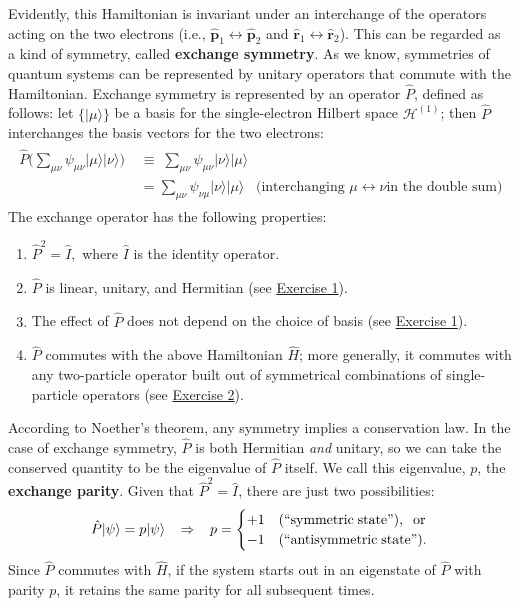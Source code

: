 \documentclass[pra,12pt]{revtex4-2}
\begin{document}
Evidently, this Hamiltonian is invariant under an interchange of the
operators acting on the two electrons (i.e., $\hat{\mathbf{p}}_1
\leftrightarrow \hat{\mathbf{p}}_2$ and $\hat{\mathbf{r}}_1
\leftrightarrow \hat{\mathbf{r}}_2$).  This can be regarded as a kind
of symmetry, called \textbf{exchange symmetry}.  As we know,
symmetries of quantum systems can be represented by unitary operators
that commute with the Hamiltonian.  Exchange symmetry is represented
by an operator $\hat{P}$, defined as follows: let $\{|\mu\rangle\}$
be a basis for the single-electron Hilbert space $\mathscr{H}^{(1)}$;
then $\hat{P}$ interchanges the basis vectors for the two electrons:
\begin{align}
  \begin{aligned}\hat{P} \Big (\sum_{\mu\nu}
    \psi_{\mu\nu} |\mu\rangle|\nu\rangle \Big)
    \;&\equiv\;  \sum_{\mu\nu} \psi_{\mu\nu} |\nu\rangle|\mu\rangle \\
    &= \sum_{\mu\nu} \psi_{\nu\mu} |\nu\rangle|\mu\rangle
    \;\;\;\textrm{(interchanging $\mu\leftrightarrow \nu$
      in the double sum)}\end{aligned}
\end{align}
The exchange operator has the following properties:
\begin{enumerate}
\item $\hat{P}^2 = \hat{I},$ where $\hat{I}$ is the identity operator.

\item $\hat{P}$ is linear, unitary, and Hermitian (see
  \hyperref[ex:1]{Exercise 1}).
  
\item The effect of $\hat{P}$ does not depend on the choice
  of basis (see \hyperref[ex:1]{Exercise 1}).

\item $\hat{P}$ commutes with the above Hamiltonian $\hat{H}$; more
  generally, it commutes with any two-particle operator built out of
  symmetrical combinations of single-particle operators (see
  \hyperref[ex:2]{Exercise 2}).
\end{enumerate}

According to Noether's theorem, any symmetry implies a conservation
law.  In the case of exchange symmetry, $\hat{P}$ is both Hermitian
\textit{and} unitary, so we can take the conserved quantity to be the
eigenvalue of $\hat{P}$ itself.  We call this eigenvalue, $p$, the
\textbf{exchange parity}.  Given that $\hat{P}^2 = \hat{I}$, there are
just two possibilities:
\begin{equation}
  \hat{P} |\psi\rangle = p|\psi\rangle \;\;\;\Rightarrow\;\;\; p = \begin{cases}+1 & \textrm{(``symmetric\;state'')}, \;\;\textrm{or} \\ -1 & \textrm{(``antisymmetric\;state'').}\end{cases}
\end{equation}
Since $\hat{P}$ commutes with $\hat{H}$, if the system starts out in
an eigenstate of $\hat{P}$ with parity $p$, it retains the same parity
for all subsequent times.
\end{document}
